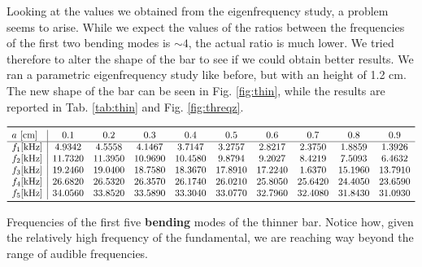 \documentclass[a4paper]{article}
\begin{document}
Looking at the values we obtained from the eigenfrequency study, a problem seems to arise. While we expect the values of the ratios between the frequencies of the first two bending modes is $\sim 4$, the actual ratio is much lower. We tried therefore to alter the shape of the bar to see if we could obtain better results. We ran a parametric eigenfrequency study like before, but with an height of 1.2 cm. The new shape of the bar can be seen in Fig. \ref{fig:thin}, while the results are reported in Tab. \ref{tab:thin} and Fig. \ref{fig:threqz}.

\begin{table}[h]
	\centering
	$\begin{array}{l|ccccccccc}
		\toprule
		a~[\si{\centi\meter}] & 0.1 & 0.2 & 0.3 & 0.4 & 0.5 & 0.6 & 0.7 & 0.8 & 0.9\\
		\hline
		f_1[\si{\kilo\hertz}]&4.9342   & 4.5558  &  4.1467  &  3.7147   & 3.2757  &  2.8217 &   2.3750 &   1.8859 &   1.3926\\
		f_2[\si{\kilo\hertz}]&11.7320  & 11.3950  & 10.9690 &  10.4580 &   9.8794  &  9.2027  &  8.4219  &  7.5093  &  6.4632\\
		f_3[\si{\kilo\hertz}]&19.2460  & 19.0400  & 18.7580 &  18.3670 &  17.8910  & 17.2240 &   1.6370 &  15.1960 &  13.7910\\
		f_4[\si{\kilo\hertz}]&26.6820  & 26.5320  & 26.3570 &  26.1740  & 26.0210 &  25.8050 &  25.6420  & 24.4050 &  23.6590\\
		f_5[\si{\kilo\hertz}]&34.0560 &  33.8520  & 33.5890  & 33.3040  & 33.0770  & 32.7960  & 32.4080 &  31.8430  & 31.0930\\
		\bottomrule
	\end{array}$
	\caption{Frequencies of the first five \textbf{bending} modes of the thinner bar. Notice how, given the relatively high frequency of the fundamental, we are reaching way beyond the range of audible frequencies.}
	\label{tab:thin}
\end{table}
\end{document}
